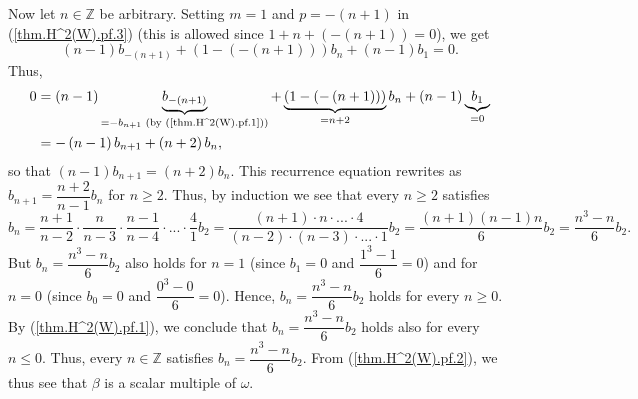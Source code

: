 \documentclass[etingof-lie.tex]{subfiles}
\begin{document}
Now let $n\in\mathbb{Z}$ be arbitrary. Setting $m=1$ and $p=-\left(
n+1\right)  $ in (\ref{thm.H^2(W).pf.3}) (this is allowed since $1+n+\left(
-\left(  n+1\right)  \right)  =0$), we get%
\[
\left(  n-1\right)  b_{-\left(  n+1\right)  }+\left(  1-\left(  -\left(
n+1\right)  \right)  \right)  b_{n}+\left(  n-1\right)  b_{1}=0.
\]
Thus,%
\begin{align*}
0  &  =\left(  n-1\right)  \underbrace{b_{-\left(  n+1\right)  }}%
_{=-b_{n+1}\text{ (by (\ref{thm.H^2(W).pf.1}))}}+\underbrace{\left(  1-\left(
-\left(  n+1\right)  \right)  \right)  }_{=n+2}b_{n}+\left(  n-1\right)
\underbrace{b_{1}}_{=0}\\
&  =-\left(  n-1\right)  b_{n+1}+\left(  n+2\right)  b_{n},
\end{align*}
so that $\left(  n-1\right)  b_{n+1}=\left(  n+2\right)  b_{n}$. This
recurrence equation rewrites as $b_{n+1}=\dfrac{n+2}{n-1}b_{n}$ for $n\geq2$.
Thus, by induction we see that every $n\geq2$ satisfies%
\[
b_{n}=\dfrac{n+1}{n-2}\cdot\dfrac{n}{n-3}\cdot\dfrac{n-1}{n-4}\cdot
...\cdot\dfrac{4}{1}b_{2}=\dfrac{\left(  n+1\right)  \cdot n\cdot...\cdot
4}{\left(  n-2\right)  \cdot\left(  n-3\right)  \cdot...\cdot1}b_{2}%
=\dfrac{\left(  n+1\right)  \left(  n-1\right)  n}{6}b_{2}=\dfrac{n^{3}-n}%
{6}b_{2}.
\]
But $b_{n}=\dfrac{n^{3}-n}{6}b_{2}$ also holds for $n=1$ (since $b_{1}=0$ and
$\dfrac{1^{3}-1}{6}=0$) and for $n=0$ (since $b_{0}=0$ and $\dfrac{0^{3}-0}%
{6}=0$). Hence, $b_{n}=\dfrac{n^{3}-n}{6}b_{2}$ holds for every $n\geq0$. By
(\ref{thm.H^2(W).pf.1}), we conclude that $b_{n}=\dfrac{n^{3}-n}{6}b_{2}$
holds also for every $n\leq0$. Thus, every $n\in\mathbb{Z}$ satisfies
$b_{n}=\dfrac{n^{3}-n}{6}b_{2}$. From (\ref{thm.H^2(W).pf.2}), we thus see
that $\beta$ is a scalar multiple of $\omega$.
\end{document}
